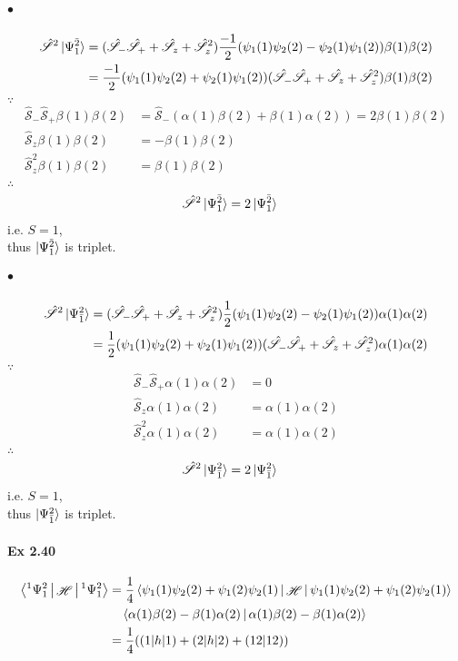 \documentclass[a4paper]{article}
\DeclareMathOperator{\sH}{\mathscr{H}}
\newcommand{\hsS}{\hat{\mathscr{S}}}
\newcommand{\ex}[1]{\paragraph{Ex #1}}
\newcommand{\subex}[1]{\subparagraph{#1}}
\numberwithin{equation}{subsection}
\begin{document}
\subex{$ \bullet $}
\begin{align}
\hsS^2\ket{\Psi_1^{\bar{2}}} &= (\hsS_-\hsS_+ + \hsS_z + \hsS_z^2)\dfrac{-1}{2}(\psi_1(1)\psi_2(2) - \psi_2(1)\psi_1(2))\beta(1)\beta(2) \notag\\
&= \dfrac{-1}{2}(\psi_1(1)\psi_2(2) + \psi_2(1)\psi_1(2))(\hsS_-\hsS_+ + \hsS_z + \hsS_z^2)\beta(1)\beta(2)
\end{align}
$ \because $
\begin{align}
\hsS_-\hsS_+ \beta(1)\beta(2) &= \hsS_-(\alpha(1)\beta(2) + \beta(1)\alpha(2)) = 2\beta(1)\beta(2) \\
\hsS_z \beta(1)\beta(2) &= -\beta(1)\beta(2)\\
\hsS_z^2 \beta(1)\beta(2) &= \beta(1)\beta(2)\\
\end{align}
$ \therefore $
\begin{align}
\hsS^2\ket{\Psi_1^{\bar{2}}} &= 2\ket{\Psi_1^{\bar{2}}}
\end{align}
i.e. $ S=1 $,\\
thus $ \ket{\Psi_1^{\bar{2}}} $ is triplet.

\subex{$ \bullet $}
\begin{align}
\hsS^2\ket{\Psi_{\bar{1}}^2} &= (\hsS_-\hsS_+ + \hsS_z + \hsS_z^2)\dfrac{1}{2}(\psi_1(1)\psi_2(2) - \psi_2(1)\psi_1(2))\alpha(1)\alpha(2) \notag\\
&= \dfrac{1}{2}(\psi_1(1)\psi_2(2) + \psi_2(1)\psi_1(2))(\hsS_-\hsS_+ + \hsS_z + \hsS_z^2)\alpha(1)\alpha(2)
\end{align}
$ \because $
\begin{align}
\hsS_-\hsS_+ \alpha(1)\alpha(2) &= 0 \\
\hsS_z \alpha(1)\alpha(2) &= \alpha(1)\alpha(2)\\
\hsS_z^2 \alpha(1)\alpha(2) &= \alpha(1)\alpha(2)\\
\end{align}
$ \therefore $
\begin{align}
\hsS^2\ket{\Psi_{\bar{1}}^2} &= 2\ket{\Psi_{\bar{1}}^2}
\end{align}
i.e. $ S=1 $,\\
thus $ \ket{\Psi_{\bar{1}}^2} $ is triplet.

\ex{2.40}
\begin{align}
\Braket{^1\Psi_1^2 | \sH | ^1\Psi_1^2} &= \dfrac{1}{4} \Braket{\psi_1(1)\psi_2(2) + \psi_1(2)\psi_2(1) | \sH | \psi_1(1)\psi_2(2) + \psi_1(2)\psi_2(1)} \notag\\
  &\quad{} \Braket{\alpha(1)\beta(2) - \beta(1)\alpha(2) | \alpha(1)\beta(2) - \beta(1)\alpha(2)}\notag\\
&= \dfrac{1}{4}((1|h|1) + (2|h|2) + (12|12))
\end{align}
\end{document}

